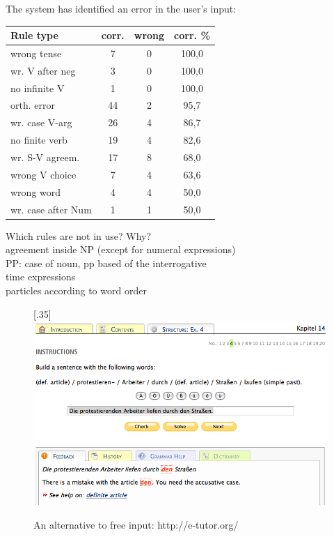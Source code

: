 \documentclass[11pt]{article}
\begin{document}
The system has identified an error in the user's input:
\begin{table}
\begin{tabular}{|l|c|c|c|}
\hline 
\textbf{Rule type}  & \textbf{corr.} & \textbf{wrong}   & \textbf{corr. \% }  \\
\hline 
wrong tense         & 7     & 0     & 100,0     \\ 
wr. V after neg   & 3     & 0     & 100,0     \\ 
no infinite V       & 1     & 0     & 100,0     \\ 
\hline 
orth. error         & 44    & 2     & 95,7      \\
wr. case V-arg  & 26    & 4     & 86,7      \\
no finite verb        & 19    & 4     &  82,6 \\
\hline 
wr. S-V agreem.   & 17    & 8     & 68,0 \\
wrong V choice        & 7     & 4     & 63,6 \\
\hline 
wrong word            & 4     & 4     & 50,0 \\
wr. case after Num  & 1     & 1     & 50,0 \\
\hline
\end{tabular}
\end{table}


Which rules are not in use? Why? \\
agreement inside NP (except for numeral expressions) \\
PP: case of noun, pp based of the interrogative  \\
time expressions \\
particles according to word order \\

\begin{figure}%
\begin{center}
\scalebox{.35}[.35]{\includegraphics{presentation/img/e-tutor.png}}\\
\caption{An alternative to free input: http://e-tutor.org/}
\end{center}
\end{figure}
 
\end{document}
